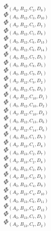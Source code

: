 \documentclass[14pt]{article}
\begin{document}
    $\Phi_{({A}_{3}, {B}_{12}, {C}_{3}, {D}_{9})}$ \\ 
    $\Phi_{({A}_{3}, {B}_{12}, {C}_{3}, {D}_{10})}$ \\ 
    $\Phi_{({A}_{3}, {B}_{12}, {C}_{5}, {D}_{7})}$ \\ 
    $\Phi_{({A}_{3}, {B}_{12}, {C}_{5}, {D}_{8})}$ \\ 
    $\Phi_{({A}_{3}, {B}_{12}, {C}_{6}, {D}_{13})}$ \\ 
    $\Phi_{({A}_{3}, {B}_{12}, {C}_{6}, {D}_{14})}$ \\ 
    $\Phi_{({A}_{3}, {B}_{12}, {C}_{7}, {D}_{5})}$ \\ 
    $\Phi_{({A}_{3}, {B}_{12}, {C}_{8}, {D}_{5})}$ \\ 
    $\Phi_{({A}_{3}, {B}_{12}, {C}_{9}, {D}_{1})}$ \\ 
    $\Phi_{({A}_{3}, {B}_{12}, {C}_{9}, {D}_{2})}$ \\ 
    $\Phi_{({A}_{3}, {B}_{12}, {C}_{9}, {D}_{3})}$ \\ 
    $\Phi_{({A}_{3}, {B}_{12}, {C}_{10}, {D}_{1})}$ \\ 
    $\Phi_{({A}_{3}, {B}_{12}, {C}_{10}, {D}_{2})}$ \\ 
    $\Phi_{({A}_{3}, {B}_{12}, {C}_{10}, {D}_{3})}$ \\ 
    $\Phi_{({A}_{3}, {B}_{12}, {C}_{13}, {D}_{6})}$ \\ 
    $\Phi_{({A}_{3}, {B}_{12}, {C}_{14}, {D}_{6})}$ \\ 
    $\Phi_{({A}_{3}, {B}_{13}, {C}_{1}, {D}_{7})}$ \\ 
    $\Phi_{({A}_{3}, {B}_{13}, {C}_{1}, {D}_{8})}$ \\ 
    $\Phi_{({A}_{3}, {B}_{13}, {C}_{2}, {D}_{7})}$ \\ 
    $\Phi_{({A}_{3}, {B}_{13}, {C}_{2}, {D}_{8})}$ \\ 
    $\Phi_{({A}_{3}, {B}_{13}, {C}_{3}, {D}_{7})}$ \\ 
    $\Phi_{({A}_{3}, {B}_{13}, {C}_{3}, {D}_{8})}$ \\ 
    $\Phi_{({A}_{3}, {B}_{13}, {C}_{4}, {D}_{9})}$ \\ 
    $\Phi_{({A}_{3}, {B}_{13}, {C}_{4}, {D}_{10})}$ \\ 
    $\Phi_{({A}_{3}, {B}_{13}, {C}_{6}, {D}_{11})}$ \\ 
    $\Phi_{({A}_{3}, {B}_{13}, {C}_{6}, {D}_{12})}$ \\ 
    $\Phi_{({A}_{3}, {B}_{13}, {C}_{7}, {D}_{1})}$ \\ 
    $\Phi_{({A}_{3}, {B}_{13}, {C}_{7}, {D}_{2})}$ \\ 
\end{document}
